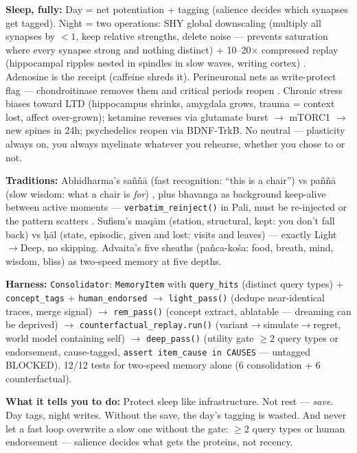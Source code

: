 \documentclass[11pt]{article}
\begin{document}
\textbf{Sleep, fully:} Day = net potentiation + tagging (salience decides which synapses get tagged). Night = two operations: SHY global downscaling \citep{tononi2014} (multiply all synapses by $<1$, keep relative strengths, delete noise --- prevents saturation where every synapse strong and nothing distinct) + 10--20$\times$ compressed replay (hippocampal ripples nested in spindles in slow waves, writing cortex) \citep{tononi2014}. Adenosine is the receipt (caffeine shreds it). Perineuronal nets as write-protect flag --- chondroitinase removes them and critical periods reopen \citep{tononi2014}. Chronic stress biases toward LTD (hippocampus shrinks, amygdala grows, trauma = context lost, affect over-grown); ketamine reverses via glutamate burst $\to$ mTORC1 $\to$ new spines in 24h; psychedelics reopen via BDNF-TrkB. No neutral --- plasticity always on, you always myelinate whatever you rehearse, whether you chose to or not.

\textbf{Traditions:} Abhidharma's sa\~n\~n\=a (fast recognition: ``this is a chair'') vs pa\~n\~n\=a (slow wisdom: what a chair is \emph{for}) \citep{ghazali1106ihya}, plus bhavanga as background keep-alive between active moments --- \texttt{verbatim\_reinject()} in Pali, must be re-injected or the pattern scatters \citep{maturana1980}. Sufism's maq\=am (station, structural, kept: you don't fall back) vs \d{h}\=al (state, episodic, given and lost: visits and leaves) \citep{ibnarabi1238futuhat} --- exactly Light$\to$Deep, no skipping. Advaita's five sheaths (pa\~nca-ko\'sa: food, breath, mind, wisdom, bliss) as two-speed memory at five depths.

\textbf{Harness:} \texttt{Consolidator}: \texttt{MemoryItem} with \texttt{query\_hits} (distinct query types) + \texttt{concept\_tags} + \texttt{human\_endorsed} $\to$ \texttt{light\_pass()} (dedupe near-identical traces, merge signal) $\to$ \texttt{rem\_pass()} (concept extract, ablatable --- dreaming can be deprived) $\to$ \texttt{counterfactual\_replay.run()} (variant$\to$simulate$\to$regret, world model containing self) $\to$ \texttt{deep\_pass()} (utility gate $\geq$2 query types or endorsement, cause-tagged, \texttt{assert item\_cause in CAUSES} --- untagged BLOCKED). 12/12 tests for two-speed memory alone (6 consolidation + 6 counterfactual).

\textbf{What it tells you to do:} Protect sleep like infrastructure. Not rest --- \emph{save}. Day tags, night writes. Without the save, the day's tagging is wasted. And never let a fast loop overwrite a slow one without the gate: $\geq$2 query types or human endorsement --- salience decides what gets the proteins, not recency.
\end{document}
